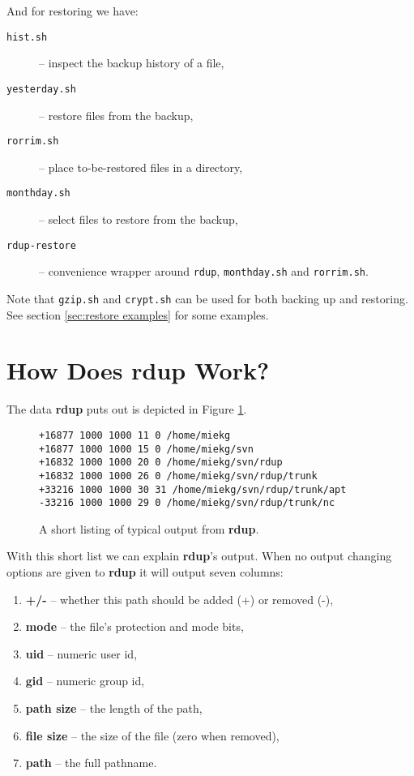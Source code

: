 \documentclass[a4paper, openany]{blocksbook}
\newcommand{\rdup}{\textbf{rdup}}
\newcommand{\cmd}[1]{\texttt{#1}}
\begin{document}
And for restoring we have:
\begin{description}
\item[\cmd{hist.sh}]{-- inspect the backup history of a file,}
\item[\cmd{yesterday.sh}]{-- restore files from the backup,}
\item[\cmd{rorrim.sh}]{-- place to-be-restored files in a directory,}
\item[\cmd{monthday.sh}]{-- select files to restore from the backup,}
\item[\cmd{rdup-restore}]{-- convenience wrapper around \cmd{rdup},
\cmd{monthday.sh} and \cmd{rorrim.sh}.} 
\end{description}

Note that \cmd{gzip.sh} and \cmd{crypt.sh} can be used for 
both backing up and restoring. See section \ref{sec:restore examples}
for some examples.

\section{How Does \rdup{} Work?}
The data \rdup{} puts out is depicted in Figure \ref{fig:rdup output}.
\begin{figure}[hbt]
\begin{verbatim}
+16877 1000 1000 11 0 /home/miekg
+16877 1000 1000 15 0 /home/miekg/svn
+16832 1000 1000 20 0 /home/miekg/svn/rdup
+16832 1000 1000 26 0 /home/miekg/svn/rdup/trunk
+33216 1000 1000 30 31 /home/miekg/svn/rdup/trunk/apt
-33216 1000 1000 29 0 /home/miekg/svn/rdup/trunk/nc
\end{verbatim}
\caption{A short listing of typical output from \rdup.}
\label{fig:rdup output}
\end{figure}

With this short list we can explain \rdup's output. When no
output changing options are given to \rdup{} it will output seven
columns:
\begin{enumerate}
\item{\textbf{+/-} -- whether this path should be added (+) or removed
(-),}
\item{\textbf{mode} -- the file's protection and mode bits,}
\item{\textbf{uid} -- numeric user id,}
\item{\textbf{gid} -- numeric group id,}
\item{\textbf{path size} -- the length of the path,}
\item{\textbf{file size} -- the size of the file (zero when removed),}
\item{\textbf{path} -- the full pathname.}
\end{enumerate}
\end{document}
